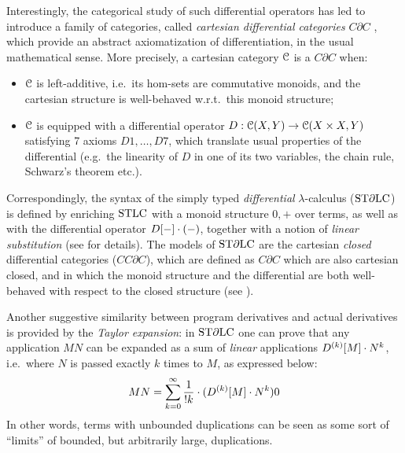 Interestingly, the categorical study of such differential operators has led to introduce a family of categories, called \emph{cartesian differential categories} $C\partial C$ \cite{}, which provide an abstract axiomatization of differentiation, in the usual mathematical sense. More precisely, a cartesian category $\mathcal{C}$ is a $C\partial C$ when:
\begin{itemize}
\item $\mathcal{C}$ is left-additive, i.e.~its hom-sets are commutative monoids, and the cartesian structure is well-behaved w.r.t.~this monoid structure;
\item $\mathcal{C}$ is equipped with a differential operator $D:
\mathcal{C}(X,Y)\to \mathcal{C}(X\times X,Y)$ satisfying 7 axioms $D1,\dots, D7$, which translate usual properties of the differential (e.g.~the linearity of $D$ in one of its two variables, the chain rule,  Schwarz's theorem etc.).
\end{itemize}

Correspondingly, the syntax of the simply typed \emph{differential} $\lambda$-calculus ($\mathrm{ST}\partial\mathrm{LC}$) is defined by enriching $\mathrm{STLC}$ with a monoid structure $0,+$ over terms, as well as with the differential operator $\Der[-]\cdot (-)$, together with a notion of \emph{linear substitution} (see \cite{} for details).
The models of $\mathrm{ST}\partial\mathrm{LC}$ are the 
cartesian \emph{closed} differential categories ($CC\partial C$), 
which are defined as $C\partial C$ which are also cartesian closed, and in which the monoid structure and the differential are both well-behaved with respect to the closed structure (see \cite{}). 


Another suggestive similarity between program derivatives and 
actual derivatives is provided by the \emph{Taylor expansion}:
in $\mathrm{ST}\partial\mathrm{LC}$ one can prove that any application $MN$ can be expanded as a sum of \emph{linear} applications
$\Der^{(k)}[M]\cdot N^{k}$, i.e.~where $N$ is passed exactly $k$ times to $M$, as expressed below:
\begin{align}\label{eq:taylor}
MN  =  \sum_{k=0}^{\infty}\frac{1}{!k}\cdot (\Der^{(k)}[M] \cdot N^{k})0
\end{align}
In other words, terms with unbounded duplications can be seen as some sort of ``limits'' of bounded, but arbitrarily large, duplications.%

